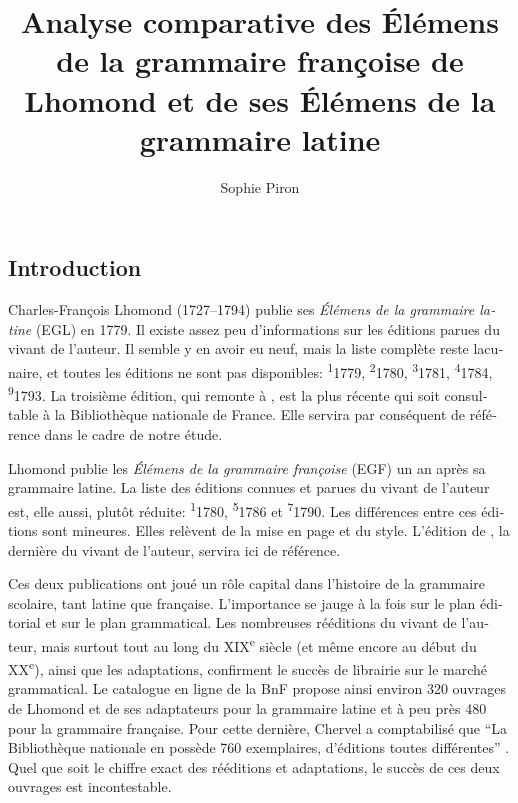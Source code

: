 \documentclass[output=paper]{langsci/langscibook}
\author{Sophie Piron\affiliation{Université du Québec à Montréal}\orcid{}}
\title{Analyse comparative des Élémens de la grammaire françoise de Lhomond et de ses Élémens de la grammaire latine}
\begin{document}
\begin{otherlanguage}{french}
\maketitle

\section{Introduction} 

 Charles-François Lhomond (1727--1794) publie ses \textit{Élémens de la grammaire latine} (EGL) en 1779. Il existe assez peu d’informations sur les éditions parues du vivant de l’auteur. Il semble y en avoir eu neuf, mais la liste complète reste lacunaire, et toutes les éditions ne sont pas disponibles: \textsuperscript{1}1779, \textsuperscript{2}1780, \textsuperscript{3}1781, \textsuperscript{4}1784, \textsuperscript{9}1793. La troisième édition, qui remonte à \citeyear{lhomond_elemens_1781}, est la plus récente qui soit consultable à la Bibliothèque nationale de France. Elle servira par conséquent de référence dans le cadre de notre étude. 

Lhomond publie les \textit{Élémens de la grammaire françoise} (EGF) un an après sa grammaire latine. La liste des éditions connues et parues du vivant de l’auteur est, elle aussi, plutôt réduite: \textsuperscript{1}1780, \textsuperscript{5}1786 et \textsuperscript{7}1790. Les différences entre ces éditions sont mineures. Elles relèvent de la mise en page et du style. L’édition de \citeyear{lhomond_elemens_1790}, la dernière du vivant de l’auteur, servira ici de référence.

Ces deux publications ont joué un rôle capital dans l’histoire de la grammaire scolaire, tant latine que française. L’importance se jauge à la fois sur le plan éditorial et sur le plan grammatical. Les nombreuses rééditions du vivant de l’auteur, mais surtout tout au long du XIX\textsuperscript{e} siècle (et même encore au début du XX\textsuperscript{e}), ainsi que les adaptations, confirment le succès de librairie sur le marché grammatical. Le catalogue en ligne de la BnF propose ainsi environ 320 ouvrages de Lhomond et de ses adaptateurs pour la grammaire latine et à peu près 480 pour la grammaire française. Pour cette dernière, Chervel a comptabilisé que “La Bibliothèque nationale en possède 760 exemplaires, d’éditions toutes différentes” \citep[63]{chervel_et_1977}. Quel que soit le chiffre exact des rééditions et adaptations, le succès de ces deux ouvrages est incontestable.


\end{otherlanguage}
\end{document}
